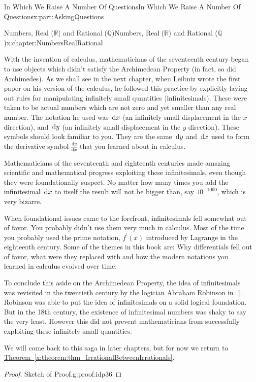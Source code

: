\documentclass[oneside,10pt,]{book}
\newcommand{\xreffont}{\relax}
\numberwithin{equation}{section}
\newcommand{\dx}[1]{\,{\rm d}#1}
\newcommand{\dfdx}[2]{\frac{\text{d}{#1}}{\text{d}{#2}}}
\newcommand{\RR}{\mathbb {R}}
\newcommand{\QQ}{\mathbb {Q}}
\begin{document}
\begin{partptx}{In Which We Raise A Number Of Questions}{}{In Which We Raise A Number Of Questions}{}{}{x:part:AskingQuestions}
\begin{chapterptx}{Numbers, Real (\(\RR\)) and Rational (\(\QQ\))}{}{Numbers, Real (\(\RR\)) and Rational (\(\QQ\))}{}{}{x:chapter:NumbersRealRational}
\begin{introduction}{}
With the invention of calculus, mathematicians of the seventeenth century began to use objects which didn't satisfy the Archimedean Property (in fact, so did Archimedes). As we shall see in the next chapter, when Leibniz wrote the first paper on his version of the calculus, he followed this practice by explicitly laying out rules for manipulating infinitely small quantities (infinitesimals). These were taken to be actual numbers which are not zero and yet smaller than any real number. The notation he used was \(\dx{ x}\) (an infinitely small displacement in the \(x\) direction), and \(\dx{ y}\) (an infinitely small displacement in the \(y\) direction). These symbols should look familiar to you. They are the same \(\dx{ y}\) and \(\dx{ x}\) used to form the derivative symbol \(\dfdx{y}{x}\) that you learned about in calculus.%
\par
Mathematicians of the seventeenth and eighteenth centuries made amazing scientific and mathematical progress exploiting these infinitesimals, even though they were foundationally suspect. No matter how many times you add the infinitesimal \(\dx{ x}\) to itself the result will not be bigger than, say \(10^{-1000}\), which is very bizarre.%
\par
When foundational issues came to the forefront, infinitesimals fell somewhat out of favor. You probably didn't use them very much in calculus. Most of the time you probably used the prime notation, \(f^\prime(x)\) introduced by Lagrange  in the eighteenth century. Some of the themes in this book are: Why differentials fell out of favor, what were they replaced with and how the modern notations you learned in calculus evolved over time.%
\par
To conclude this aside on the Archimedean Property, the idea of infinitesimals was revisited in the twentieth century by the logician Abraham Robinson in~\hyperlink{x:biblio:robinson74__non_stand_analy}{[{\xreffont 12}]}. Robinson was able to put the idea of infinitesimals on a solid logical foundation. But in the 18th century, the existence of infinitesimal numbers was shaky to say the very least. However this did not prevent mathematicians from successfully exploiting these infinitely small quantities.%
\par
We will come back to this saga in later chapters, but for now we return to \hyperref[x:theorem:thm_IrrationalBetweenIrrationals]{Theorem~{\xreffont\ref{x:theorem:thm_IrrationalBetweenIrrationals}}}.%
\begin{proof}{Sketch of Proof.}{g:proof:idp36}

\end{proof}
\end{introduction}
\end{chapterptx}
\end{partptx}
\end{document}
